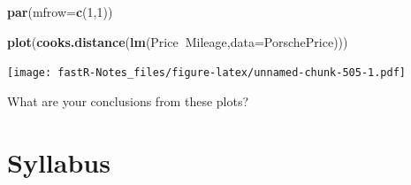\documentclass[]{book}
\newenvironment{Shaded}{\begin{snugshade}}{\end{snugshade}}
\newcommand{\KeywordTok}[1]{\textcolor[rgb]{0.13,0.29,0.53}{\textbf{#1}}}
\newcommand{\DataTypeTok}[1]{\textcolor[rgb]{0.13,0.29,0.53}{#1}}
\newcommand{\DecValTok}[1]{\textcolor[rgb]{0.00,0.00,0.81}{#1}}
\newcommand{\OperatorTok}[1]{\textcolor[rgb]{0.81,0.36,0.00}{\textbf{#1}}}
\newcommand{\NormalTok}[1]{#1}
\theoremstyle{definition}
\theoremstyle{definition}
\theoremstyle{definition}
\theoremstyle{remark}
\begin{document}
\begin{Shaded}
\begin{Highlighting}[]
\KeywordTok{par}\NormalTok{(}\DataTypeTok{mfrow=}\KeywordTok{c}\NormalTok{(}\DecValTok{1}\NormalTok{,}\DecValTok{1}\NormalTok{))}
\end{Highlighting}
\end{Shaded}

\begin{Shaded}
\begin{Highlighting}[]
\KeywordTok{plot}\NormalTok{(}\KeywordTok{cooks.distance}\NormalTok{(}\KeywordTok{lm}\NormalTok{(Price}\OperatorTok{~}\NormalTok{Mileage,}\DataTypeTok{data=}\NormalTok{PorschePrice)))}
\end{Highlighting}
\end{Shaded}

\texttt{[image: fastR-Notes\_files/figure-latex/unnamed-chunk-505-1.pdf]}

What are your conclusions from these plots?

\appendix


\chapter{Syllabus}\label{AppA}
\end{document}
